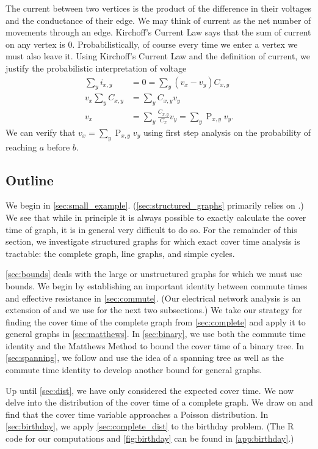 \documentclass[12pt]{article}
\theoremstyle{definition}
\DeclareMathOperator{\pr}{\mathrm{P}}		     %
\begin{document}
The current between two vertices is the product of the
difference in their voltages and the conductance of their edge.
We may think of current as the net number of movements through an edge.
Kirchoff's Current Law says that the sum of current on any vertex is 0.
Probabilistically, of course every time we enter a vertex we must also leave it.
Using Kirchoff's Current Law and the definition of current,
we justify the probabilistic interpretation of voltage
\begin{align}
\sum_y i_{x,y} &= 0 = \sum_y (v_x - v_y)C_{x,y} \nonumber \\
v_x \sum_y C_{x,y} &= \sum_y C_{x,y} v_y \nonumber \\
v_x &= \sum_y \frac{C_{x,y}}{C_x} v_y = \sum_y \pr_{x,y} v_y. \nonumber
\end{align}
We can verify that $v_x = \sum_y \pr_{x,y} v_y$
using first step analysis on the probability of reaching $a$ before $b$.

\subsection{Outline}

We begin in \cref{sec:small_example}.
(\cref{sec:structured_graphs} primarily relies on \cite{BH94}.)
We see that while in principle it is always possible to exactly 
calculate the cover time
of graph, it is in general very difficult to do so.
For the remainder of this section, we investigate
structured graphs for which exact cover time analysis is tractable:
the complete graph, line graphs, and simple cycles.

\cref{sec:bounds} deals with the large or unstructured graphs 
for which we must use bounds.
We begin by establishing an important identity between
commute times and effective resistance in \cref{sec:commute}.
(Our electrical network analysis is an extension of \cite{DS84}
and we use \cite{LP17} for the next two subsections.)
We take our strategy for finding the cover time of the complete graph
from \cref{sec:complete} and apply it to general graphs in \cref{sec:matthews}.
In \cref{sec:binary}, we use both the commute time identity and the Matthews Method
to bound the cover time of a binary tree.
In \cref{sec:spanning}, we follow \cite{AF14} and use the idea of a spanning tree
as well as the commute time identity to develop another bound for general graphs.

Up until \cref{sec:dist}, we have only considered the expected cover time.
We now delve into the distribution of the cover time of a complete graph.
We draw on \cite{Du11} and find that the cover time variable approaches a Poisson
distribution.
In \cref{sec:birthday}, we apply \cref{sec:complete_dist} to the birthday problem.
(The R code for our computations and \cref{fig:birthday} can be found in \cref{app:birthday}.)
\end{document}
